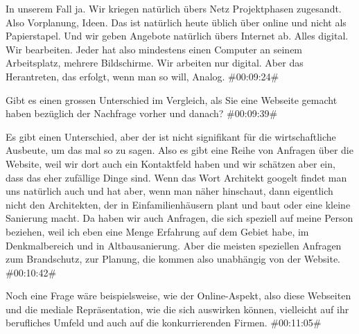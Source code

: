 \begin{description}
\Andre In unserem Fall ja. Wir kriegen natürlich übers Netz Projektphasen zugesandt. Also Vorplanung, Ideen. Das ist natürlich heute üblich über online und nicht als Papierstapel. Und wir geben Angebote natürlich übers Internet ab. Alles digital. Wir bearbeiten. Jeder hat also mindestens einen Computer an seinem Arbeitsplatz, mehrere Bildschirme. Wir arbeiten nur digital. Aber das Herantreten, das erfolgt, wenn man so will, Analog. \#00:09:24\#

\Toni Gibt es einen grossen Unterschied im Vergleich, als Sie eine Webseite gemacht haben bezüglich der Nachfrage vorher und danach? \#00:09:39\#

\Andre Es gibt einen Unterschied, aber der ist nicht signifikant für die wirtschaftliche Ausbeute, um das mal so zu sagen. Also es gibt eine Reihe von Anfragen über die Website, weil wir dort auch ein Kontaktfeld haben und wir schätzen aber ein, dass das eher zufällige Dinge sind. Wenn das Wort Architekt googelt findet man uns natürlich auch und hat aber, wenn man näher hinschaut, dann eigentlich nicht den Architekten, der in Einfamilienhäusern plant und baut oder eine kleine Sanierung macht. Da haben wir auch Anfragen, die sich speziell auf meine Person beziehen, weil ich eben eine Menge Erfahrung auf dem Gebiet habe, im Denkmalbereich und in Altbausanierung. Aber die meisten speziellen Anfragen zum Brandschutz, zur Planung, die kommen also unabhängig von der Website. \#00:10:42\#

\Toni Noch eine Frage wäre beispielsweise, wie der Online-Aspekt, also diese Webseiten und die mediale Repräsentation, wie die sich auswirken können, vielleicht auf ihr berufliches Umfeld und auch auf die konkurrierenden Firmen. \#00:11:05\#


\end{description}
